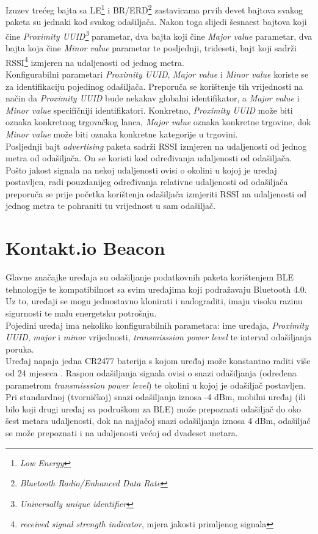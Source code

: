 Izuzev trećeg bajta sa LE\footnote{\textit{Low Energy}} i BR/ERD\footnote{\textit{Bluetooth Radio/Enhanced Data Rate}} zastavicama prvih devet bajtova svakog paketa su jednaki kod svakog odašiljača. 
Nakon toga slijedi šesnaest bajtova koji čine \textit{Proximity UUID\footnote{\textit{Universally unique identifier}}} parametar, dva bajta koji čine \textit{Major value} parametar, dva bajta koja čine \textit{Minor value} parametar te posljednji, trideseti, bajt koji sadrži RSSI\footnote{\textit{received signal strength indicator}, mjera jakosti primljenog signala} izmjeren na udaljenosti od jednog metra.
\\
Konfigurabilni parametari \textit{Proximity UUID}, \textit{Major value} i \textit{Minor value} koriste se za identifikaciju pojedinog odašiljača. 
Preporuča se korištenje tih vrijednosti na način da \textit{Proximity UUID} bude nekakav globalni identifikator, a \textit{Major value} i \textit{Minor value} specifičniji identifikatori. 
Konkretno, \textit{Proximity UUID} može biti oznaka konkretnog trgovačkog lanca, \textit{Major value} oznaka konkretne trgovine, dok \textit{Minor value} može biti oznaka konkretne kategorije u trgovini.
\\
Posljednji bajt \textit{advertising} paketa sadrži RSSI izmjeren na udaljenosti od jednog metra od odašiljača. 
On se koristi kod određivanja udaljenosti od odašiljača. 
Pošto jakost signala na nekoj udaljenosti ovisi o okolini u kojoj je uređaj postavljen, radi pouzdanijeg određivanja relativne udaljenosti od odašiljača preporuča se prije početka korištenja odašiljača izmjeriti RSSI na udaljenosti od jednog metra te pohraniti tu vrijednost u sam odašiljač.

\section*{Kontakt.io Beacon}

Glavne značajke uređaja su odašiljanje podatkovnih paketa korištenjem BLE tehnologije te kompatibilnost sa svim uređajima koji podražavaju Bluetooth 4.0. 
Uz to, uređaji se mogu jednostavno klonirati i nadograditi, imaju visoku razinu sigurnosti te malu energetsku potrošnju.
\\
Pojedini uređaj ima nekoliko konfigurabilnih parametara: ime uređaja, \textit{Proximity UUID}, \textit{major} i \textit{minor} vrijednosti, \textit{transmisssion power level} te interval odašiljanja poruka.
\\
Uređaj napaja jedna CR2477 baterija s kojom uređaj može konstantno raditi više od 24 mjeseca \citep{kontaktDatasheet}. 
Raspon odašiljanja signala ovisi o snazi odašiljanja (određena parametrom \textit{transmisssion power level}) te okolini u kojoj je odašiljač postavljen. 
Pri standardnoj (tvorničkoj) snazi odašiljanja iznosa -4 dBm, mobilni uređaj (ili bilo koji drugi uređaj sa podruškom za BLE) može prepoznati odašiljač do oko šest metara udaljenosti, dok na najjačoj snazi odašiljanja iznosa 4 dBm, odašiljač se može prepoznati i na udaljenosti većoj od dvadeset metara.

